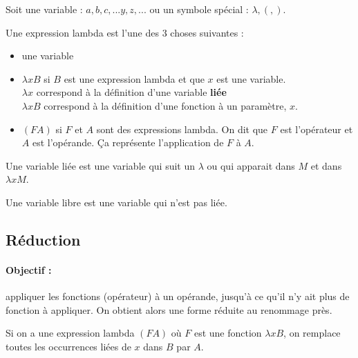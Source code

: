 \begin{mydef} Soit une variable : $a,b,c,...y,z,...$ ou un
	symbole spécial : $\lambda, (, )$.
\end{mydef}

\begin{mydef} Une expression lambda est l'une des 3 choses suivantes :
	\begin{itemize}
		\item une variable
		\item $\lambda xB$ si $B$ est une expression lambda et que $x$ est
			une variable. \\
			$\lambda x$ correspond à la définition
			d'une variable \textbf{liée} \\
			$\lambda xB$ correspond à la définition d'une fonction
			à un paramètre, $x$.
		\item $(FA)$ si $F$ et $A$ sont des expressions lambda. On dit que $F$
			est l'opérateur et $A$ est l'opérande. Ça représente
			l'application de $F$ à $A$.
	\end{itemize}
\end{mydef}

\begin{mydef} Une variable liée est une variable qui suit un $\lambda$ ou qui
	apparait dans $M$ et dans $\lambda xM$.
\end{mydef}

\begin{mydef} Une variable libre est une variable qui n'est pas liée.
\end{mydef}

\subsection{Réduction}

\paragraph{Objectif :} appliquer les fonctions (opérateur) à un opérande,
jusqu'à ce qu'il n'y ait plus de fonction à appliquer. On obtient alors une
forme réduite au renommage près.

\begin{mydef} Si on a une expression lambda $(FA)$ où
	$F$ est une fonction $\lambda xB$, on remplace toutes les occurrences liées
	de $x$ dans $B$ par $A$.
\end{mydef}

